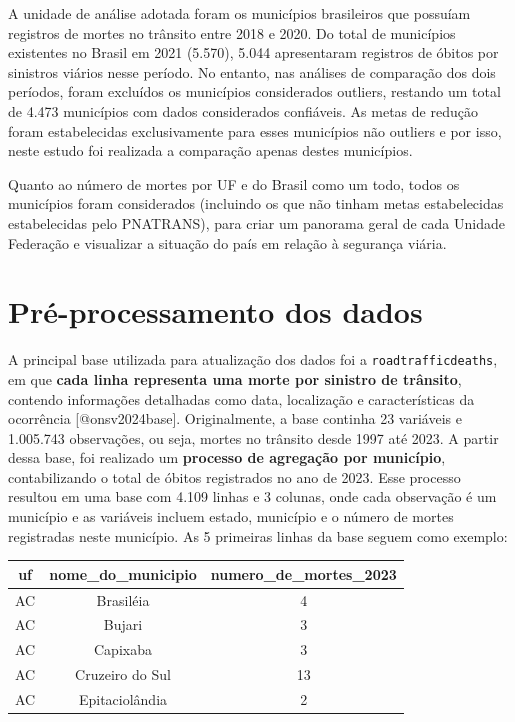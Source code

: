 \documentclass[
  letterpaper,
  DIV=11,
  numbers=noendperiod]{scrreprt}
\begin{document}
A unidade de análise adotada foram os municípios brasileiros que
possuíam registros de mortes no trânsito entre 2018 e 2020. Do total de
municípios existentes no Brasil em 2021 (5.570), 5.044 apresentaram
registros de óbitos por sinistros viários nesse período. No entanto, nas
análises de comparação dos dois períodos, foram excluídos os municípios
considerados outliers, restando um total de 4.473 municípios com dados
considerados confiáveis. As metas de redução foram estabelecidas
exclusivamente para esses municípios não outliers e por isso, neste
estudo foi realizada a comparação apenas destes municípios.

Quanto ao número de mortes por UF e do Brasil como um todo, todos os
municípios foram considerados (incluindo os que não tinham metas
estabelecidas estabelecidas pelo PNATRANS), para criar um panorama geral
de cada Unidade Federação e visualizar a situação do país em relação à
segurança viária.

\section{Pré-processamento dos
dados}\label{pruxe9-processamento-dos-dados}

A principal base utilizada para atualização dos dados foi a
\texttt{roadtrafficdeaths}, em que \textbf{cada linha representa uma
morte por sinistro de trânsito}, contendo informações detalhadas como
data, localização e características da ocorrência {[}@onsv2024base{]}.
Originalmente, a base continha 23 variáveis e 1.005.743 observações, ou
seja, mortes no trânsito desde 1997 até 2023. A partir dessa base, foi
realizado um \textbf{processo de agregação por município},
contabilizando o total de óbitos registrados no ano de 2023. Esse
processo resultou em uma base com 4.109 linhas e 3 colunas, onde cada
observação é um município e as variáveis incluem estado, município e o
número de mortes registradas neste município. As 5 primeiras linhas da
base seguem como exemplo:

\begin{longtable}[]{@{}ccc@{}}
\toprule\noalign{}
uf & nome\_do\_municipio & numero\_de\_mortes\_2023 \\
\midrule\noalign{}
\endhead
\bottomrule\noalign{}
\endlastfoot
AC & Brasiléia & 4 \\
AC & Bujari & 3 \\
AC & Capixaba & 3 \\
AC & Cruzeiro do Sul & 13 \\
AC & Epitaciolândia & 2 \\
\end{longtable}
\end{document}
